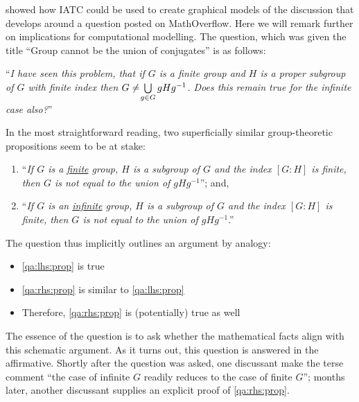 \documentclass[smallextended,oneside]{svjour3}       %
\newcounter{turn}
\let\cite\citep
\newcommand\nothing[1]{#1}
\let\paragraph\nothing
\begin{document}
\paragraph{\citet{corneli2017towards} showed how IATC could be used to create graphical models of the discussion that develops around a question posted on MathOverflow.  Here we will remark further on implications for computational modelling.
The question, which was given the title  ``Group cannot be the union of conjugates'' \cite{chandrasekhar2010group} is as follows:

\medskip

\noindent ``\emph{I have seen this problem, that if $G$ is a finite group and $H$ is a
  proper subgroup of $G$ with finite index then $ G \neq\hspace{-.2em}\bigcup\limits_{g \in G} gHg^{-1}$. Does this remain true for the
  infinite case also?}''

\noindent 
In the most straightforward reading, two superficially similar group-theoretic propositions seem
to be at stake:
\begin{enumerate}[label=(\emph{P\arabic*}),ref=(\emph{P\arabic*}),leftmargin=1cm]
\item ``\emph{If $G$ is a \uline{finite} group, $H$ is a subgroup of $G$ and the
  index $[G \mathop{:} H]$ is finite, then $G$ is not equal to the
  union of $gHg^{-1}$}''; and, \label{qa:lhs:prop}
\item ``\emph{If $G$ is an \uline{infinite} group, $H$ is a subgroup of $G$
  and the index $[G \mathop{:} H]$ is finite, then $G$ is not equal to
  the union of $gHg^{-1}$}.'' \label{qa:rhs:prop}
\end{enumerate}
The question thus implicitly outlines an argument by analogy:
\begin{itemize}
\item \ref{qa:lhs:prop} is true
\item \ref{qa:rhs:prop} is similar to \ref{qa:lhs:prop}
\item Therefore, \ref{qa:rhs:prop} is (potentially) true as well
\end{itemize} 
The essence of the question is to ask whether the mathematical facts
align with this schematic argument.
As it turns out, this question is answered in the affirmative.
Shortly after the question was asked, one discussant make the terse
comment ``the case of infinite $G$ readily reduces to the case of
finite $G$''; months later, another discussant supplies an explicit
proof of \ref{qa:rhs:prop}.

}
\end{document}
